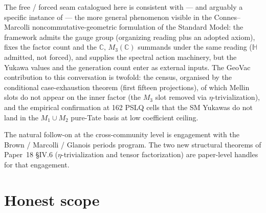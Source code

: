\documentclass[11pt,a4paper]{article}
\theoremstyle{plain}
\theoremstyle{definition}
\begin{document}
The free / forced seam catalogued here is consistent with --- and arguably a specific instance of --- the more general phenomenon visible in the Connes--Marcolli noncommutative-geometric formulation of the Standard Model:  the framework admits the gauge group (organizing reading plus an adopted axiom), fixes the factor count and the $\mathbb{C}$, $M_3(\mathbb{C})$ summands under the same reading ($\mathbb{H}$ admitted, not forced), and supplies the spectral action machinery, but the Yukawa values and the generation count enter as external inputs. The GeoVac contribution to this conversation is twofold:  the census, organised by the conditional case-exhaustion theorem (first fifteen projections), of which Mellin slots do not appear on the inner factor (the $M_3$ slot removed via $\eta$-trivialization), and the empirical confirmation at 162 PSLQ cells that the SM Yukawas do not land in the $M_1 \cup M_2$ pure-Tate basis at low coefficient ceiling.

The natural follow-on at the cross-community level is engagement with the Brown / Marcolli / Glanois periods program. The two new structural theorems of Paper~18 \S IV.6 ($\eta$-trivialization and tensor factorization) are paper-level handles for that engagement.

\section*{Honest scope}
\end{document}
